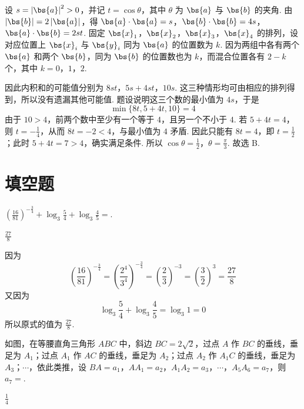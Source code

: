 \begin{solution}
设 \(s=\left|\bs{a}\right|^2>0\)，并记 \(t=\cos\theta\)，其中 \(\theta\) 为 \(\bs{a}\) 与 \(\bs{b}\) 的夹角. 由 \(\left|\bs{b}\right|=2\left|\bs{a}\right|\)，得
 \(\bs{a}\cdot\bs{a}=s\)，\(\bs{b}\cdot\bs{b}=4s\)，\(\bs{a}\cdot\bs{b}=2st\).
固定 \(\bs{x}_1\)，\(\bs{x}_2\)，\(\bs{x}_3\)，\(\bs{x}_4\) 的排列，设对应位置上 \(\bs{x}_i\) 与 \(\bs{y}_i\) 同为 \(\bs{a}\) 的位置数为 \(k\). 因为两组中各有两个 \(\bs{a}\) 和两个 \(\bs{b}\)，同为 \(\bs{b}\) 的位置数也为 \(k\)，而混合位置各有 \(2-k\) 个，其中 \(k=0\)，\(1\)，\(2\).

因此内积和的可能值分别为 \(8st\)，\(5s+4st\)，\(10s\). 这三种情形均可由相应的排列得到，所以没有遗漏其他可能值.
题设说明这三个数的最小值为 \(4s\)，于是
\[
\min\{8t,5+4t,10\}=4
\]
由于 \(10>4\)，前两个数中至少有一个等于 \(4\)，且另一个不小于 \(4\). 若 \(5+4t=4\)，则 \(t=-\frac14\)，从而 \(8t=-2<4\)，与最小值为 \(4\) 矛盾. 因此只能有 \(8t=4\)，即 \(t=\frac12\)；此时 \(5+4t=7>4\)，确实满足条件.
所以 \(\cos\theta=\frac12\)，\(\theta=\frac{\pi}{3}\).
故选 B.
\end{solution}

\section{填空题}

\begin{problem}
\(\left(\frac{16}{81}\right)^{-\frac{3}{4}} + \log_{3}\frac{5}{4} + \log_{3}\frac{4}{5} =\)\fillinblank{}.

\begin{answer}
\(\frac{27}{8}\)
\end{answer}
\end{problem}

\begin{solution}
因为
\[
\left(\frac{16}{81}\right)^{-\frac34}
=\left(\frac{2^4}{3^4}\right)^{-\frac34}
=\left(\frac23\right)^{-3}
=\left(\frac32\right)^3
=\frac{27}{8}
\]
又因为
\[
\log_3\frac54+\log_3\frac45=\log_3 1=0
\]
所以原式的值为 \(\frac{27}{8}\).
\end{solution}

\begin{problem}
如图，在等腰直角三角形 \(ABC\) 中，斜边 \(BC = 2\sqrt{2}\)，过点 \(A\) 作 \(BC\) 的垂线，垂足为 \(A_1\)；过点 \(A_1\) 作 \(AC\) 的垂线，垂足为 \(A_2\)；过点 \(A_2\) 作 \(A_1C\) 的垂线，垂足为 \(A_3\)；\(\cdots\)，依此类推，设 \(BA = a_1\)，\(AA_1 = a_2\)，\(A_1A_2 = a_3\)，\(\cdots\)，\(A_5A_6 = a_7\)，则 \(a_7 =\)\fillinblank{}.


\begin{answer}
\(\frac{1}{4}\)
\end{answer}
\end{problem}

